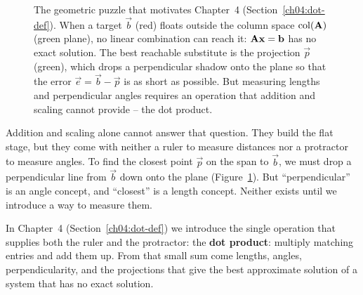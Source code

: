 \begin{figure}[H]
\centering
{}
\caption{The geometric puzzle that motivates Chapter~4 (Section~\ref{ch04:dot-def}). When a target $\vec{b}$ (red) floats outside the column space $\operatorname{col}(\mathbf{A})$ (green plane), no linear combination can reach it: $\mathbf{A}\mathbf{x}=\mathbf{b}$ has no exact solution. The best reachable substitute is the projection $\vec{p}$ (green), which drops a perpendicular shadow onto the plane so that the error $\vec{e} = \vec{b}-\vec{p}$ is as short as possible. But measuring lengths and perpendicular angles requires an operation that addition and scaling cannot provide -- the dot product.}
\label{ch03:projection-bridge}
\end{figure}

Addition and scaling alone cannot answer that question. They build the flat stage, but they come with neither a ruler to measure distances nor a protractor to measure angles. To find the closest point $\vec{p}$ on the span to $\vec{b}$, we must drop a perpendicular line from $\vec{b}$ down onto the plane (Figure~\ref{ch03:projection-bridge}). But ``perpendicular'' is an angle concept, and ``closest'' is a length concept. Neither exists until we introduce a way to measure them.

In Chapter~4 (Section~\ref{ch04:dot-def}) we introduce the single operation that supplies both the ruler and the protractor: the \textbf{dot product}: multiply matching entries and add them up. From that small sum come lengths, angles, perpendicularity, and the projections that give the best approximate solution of a system that has no exact solution.

